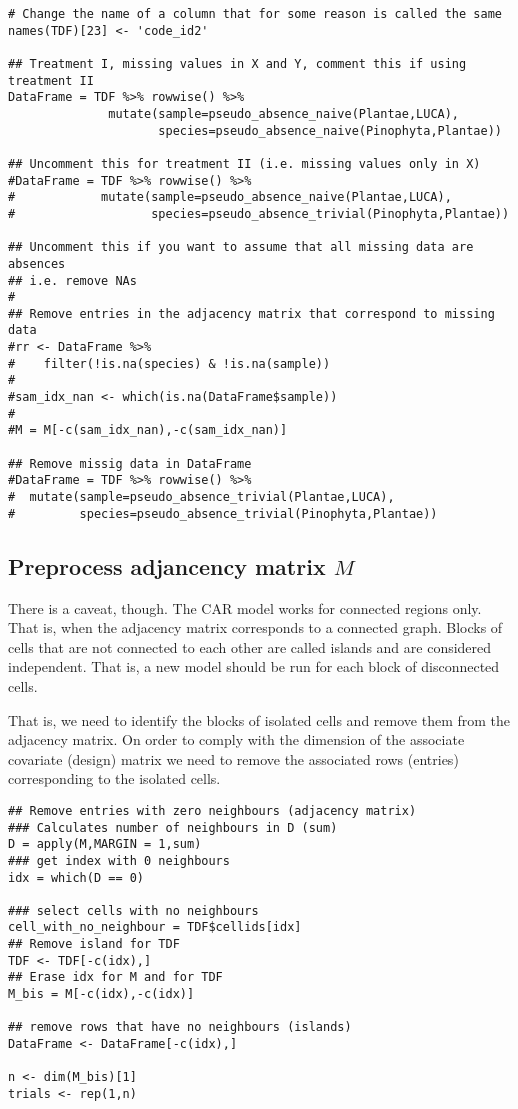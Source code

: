 \documentclass[11pt]{article}
\begin{document}
\begin{verbatim}
# Change the name of a column that for some reason is called the same
names(TDF)[23] <- 'code_id2'

## Treatment I, missing values in X and Y, comment this if using treatment II
DataFrame = TDF %>% rowwise() %>%
              mutate(sample=pseudo_absence_naive(Plantae,LUCA),
                     species=pseudo_absence_naive(Pinophyta,Plantae))

## Uncomment this for treatment II (i.e. missing values only in X)
#DataFrame = TDF %>% rowwise() %>%
#            mutate(sample=pseudo_absence_naive(Plantae,LUCA),
#                   species=pseudo_absence_trivial(Pinophyta,Plantae))

## Uncomment this if you want to assume that all missing data are absences
## i.e. remove NAs
#
## Remove entries in the adjacency matrix that correspond to missing data
#rr <- DataFrame %>%
#    filter(!is.na(species) & !is.na(sample))
#
#sam_idx_nan <- which(is.na(DataFrame$sample))
#
#M = M[-c(sam_idx_nan),-c(sam_idx_nan)]

## Remove missig data in DataFrame
#DataFrame = TDF %>% rowwise() %>%
#  mutate(sample=pseudo_absence_trivial(Plantae,LUCA),
#         species=pseudo_absence_trivial(Pinophyta,Plantae))
\end{verbatim}

\subsection{Preprocess adjancency matrix \(M\)}
\label{sec:org7b0e187}
There is a caveat, though. The CAR model works for connected regions only. That is, when the adjacency matrix corresponds to a connected graph. Blocks of cells that are not connected to each other are called islands and are considered independent. That is, a new model should be run for each block of disconnected cells.

That is, we need to identify the blocks of isolated cells and remove them from the adjacency matrix. On order to comply with the dimension of the associate covariate (design) matrix we need to remove the associated rows (entries) corresponding to the isolated cells.

\begin{verbatim}
## Remove entries with zero neighbours (adjacency matrix)
### Calculates number of neighbours in D (sum)
D = apply(M,MARGIN = 1,sum)
### get index with 0 neighbours
idx = which(D == 0)

### select cells with no neighbours
cell_with_no_neighbour = TDF$cellids[idx]
## Remove island for TDF
TDF <- TDF[-c(idx),]
## Erase idx for M and for TDF
M_bis = M[-c(idx),-c(idx)]

## remove rows that have no neighbours (islands)
DataFrame <- DataFrame[-c(idx),]

n <- dim(M_bis)[1]
trials <- rep(1,n)

\end{verbatim}
\end{document}

